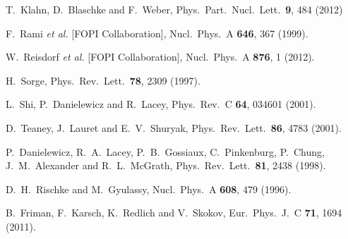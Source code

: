 \documentclass[epj]{svjour}
\begin{document}
\begin{thebibliography}{9}
  T.~Klahn, D.~Blaschke and F.~Weber,
  Phys.\ Part.\ Nucl.\ Lett.\  {\bf 9}, 484 (2012)

  F.~Rami {\it et al.}  [FOPI Collaboration],
  Nucl.\ Phys.\ A {\bf 646}, 367 (1999).

  W.~Reisdorf {\it et al.}  [FOPI Collaboration],
  Nucl.\ Phys.\ A {\bf 876}, 1 (2012).

  H.~Sorge,
  Phys.\ Rev.\ Lett.\  {\bf 78}, 2309 (1997).

  L.~Shi, P.~Danielewicz and R.~Lacey,
  Phys.\ Rev.\ C {\bf 64}, 034601 (2001).

  D.~Teaney, J.~Lauret and E.~V.~Shuryak,
  Phys.\ Rev.\ Lett.\  {\bf 86}, 4783 (2001).

  P.~Danielewicz, R.~A.~Lacey, P.~B.~Gossiaux, C.~Pinkenburg, P.~Chung, J.~M.~Alexander and R.~L.~McGrath,
  Phys.\ Rev.\ Lett.\  {\bf 81}, 2438 (1998).

  D.~H.~Rischke and M.~Gyulassy,
  Nucl.\ Phys.\ A {\bf 608}, 479 (1996).

  B.~Friman, F.~Karsch, K.~Redlich and V.~Skokov,
  Eur.\ Phys.\ J.\ C {\bf 71}, 1694 (2011).


\end{thebibliography}
\end{document}
